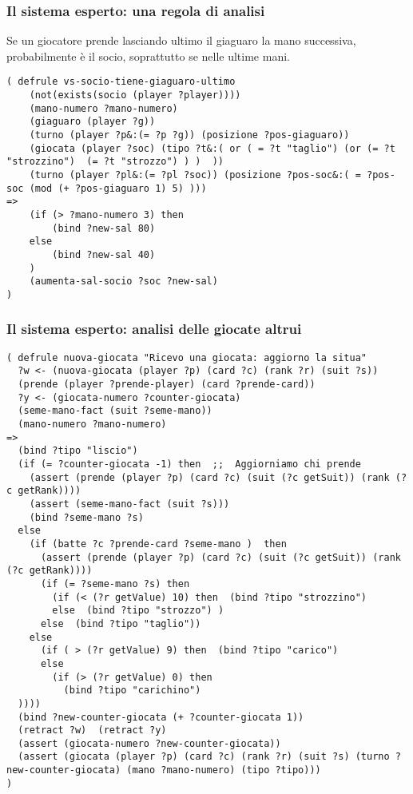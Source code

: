\documentclass{beamer}
\begin{document}
\begin{frame}[fragile]
   \frametitle{Il sistema esperto: una regola di analisi}
   Se un giocatore prende lasciando ultimo il giaguaro la mano successiva, probabilmente è il socio, soprattutto se nelle ultime mani.

\begin{lstlisting}
( defrule vs-socio-tiene-giaguaro-ultimo
    (not(exists(socio (player ?player))))
    (mano-numero ?mano-numero)
    (giaguaro (player ?g))
    (turno (player ?p&:(= ?p ?g)) (posizione ?pos-giaguaro))
    (giocata (player ?soc) (tipo ?t&:( or ( = ?t "taglio") (or (= ?t "strozzino")  (= ?t "strozzo") ) )  ))
    (turno (player ?pl&:(= ?pl ?soc)) (posizione ?pos-soc&:( = ?pos-soc (mod (+ ?pos-giaguaro 1) 5) )))
=>
    (if (> ?mano-numero 3) then
        (bind ?new-sal 80)
    else
        (bind ?new-sal 40)
    )
    (aumenta-sal-socio ?soc ?new-sal)
)
\end{lstlisting}
\end{frame}


\begin{frame}[fragile]
   \frametitle{Il sistema esperto: analisi delle giocate altrui}
   \begin{lstlisting}
( defrule nuova-giocata "Ricevo una giocata: aggiorno la situa"
  ?w <- (nuova-giocata (player ?p) (card ?c) (rank ?r) (suit ?s))
  (prende (player ?prende-player) (card ?prende-card))
  ?y <- (giocata-numero ?counter-giocata)
  (seme-mano-fact (suit ?seme-mano))
  (mano-numero ?mano-numero)
=>
  (bind ?tipo "liscio")
  (if (= ?counter-giocata -1) then  ;;  Aggiorniamo chi prende
    (assert (prende (player ?p) (card ?c) (suit (?c getSuit)) (rank (?c getRank))))
    (assert (seme-mano-fact (suit ?s)))
    (bind ?seme-mano ?s)
  else
    (if (batte ?c ?prende-card ?seme-mano )  then
      (assert (prende (player ?p) (card ?c) (suit (?c getSuit)) (rank (?c getRank))))
      (if (= ?seme-mano ?s) then
        (if (< (?r getValue) 10) then  (bind ?tipo "strozzino")
        else  (bind ?tipo "strozzo") )
      else  (bind ?tipo "taglio"))
    else
      (if ( > (?r getValue) 9) then  (bind ?tipo "carico")
      else
        (if (> (?r getValue) 0) then
          (bind ?tipo "carichino")
  ))))
  (bind ?new-counter-giocata (+ ?counter-giocata 1))
  (retract ?w)  (retract ?y)
  (assert (giocata-numero ?new-counter-giocata))
  (assert (giocata (player ?p) (card ?c) (rank ?r) (suit ?s) (turno ?new-counter-giocata) (mano ?mano-numero) (tipo ?tipo)))  
)
   \end{lstlisting}
   
\end{frame}
\end{document}
